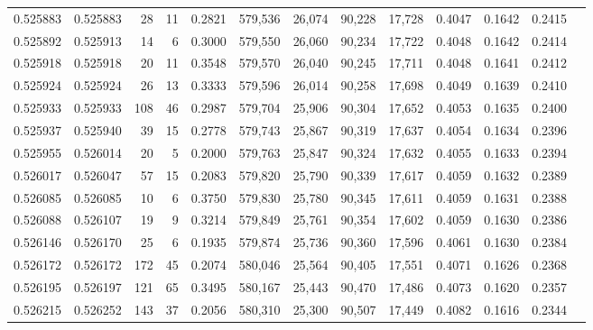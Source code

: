 \begin{tabular}{rrrrrrrrrrrrr}
0.525883 & 0.525883 &    28 &    11 &                                     0.2821 & 579,536 &  26,074 &  90,228 &  17,728 & 0.4047 & 0.1642 & 0.2415 \\
0.525892 & 0.525913 &    14 &     6 &                                     0.3000 & 579,550 &  26,060 &  90,234 &  17,722 & 0.4048 & 0.1642 & 0.2414 \\
0.525918 & 0.525918 &    20 &    11 &                                     0.3548 & 579,570 &  26,040 &  90,245 &  17,711 & 0.4048 & 0.1641 & 0.2412 \\
0.525924 & 0.525924 &    26 &    13 &                                     0.3333 & 579,596 &  26,014 &  90,258 &  17,698 & 0.4049 & 0.1639 & 0.2410 \\
0.525933 & 0.525933 &   108 &    46 &                                     0.2987 & 579,704 &  25,906 &  90,304 &  17,652 & 0.4053 & 0.1635 & 0.2400 \\
0.525937 & 0.525940 &    39 &    15 &                                     0.2778 & 579,743 &  25,867 &  90,319 &  17,637 & 0.4054 & 0.1634 & 0.2396 \\
0.525955 & 0.526014 &    20 &     5 &                                     0.2000 & 579,763 &  25,847 &  90,324 &  17,632 & 0.4055 & 0.1633 & 0.2394 \\
0.526017 & 0.526047 &    57 &    15 &                                     0.2083 & 579,820 &  25,790 &  90,339 &  17,617 & 0.4059 & 0.1632 & 0.2389 \\
0.526085 & 0.526085 &    10 &     6 &                                     0.3750 & 579,830 &  25,780 &  90,345 &  17,611 & 0.4059 & 0.1631 & 0.2388 \\
0.526088 & 0.526107 &    19 &     9 &                                     0.3214 & 579,849 &  25,761 &  90,354 &  17,602 & 0.4059 & 0.1630 & 0.2386 \\
0.526146 & 0.526170 &    25 &     6 &                                     0.1935 & 579,874 &  25,736 &  90,360 &  17,596 & 0.4061 & 0.1630 & 0.2384 \\
0.526172 & 0.526172 &   172 &    45 &                                     0.2074 & 580,046 &  25,564 &  90,405 &  17,551 & 0.4071 & 0.1626 & 0.2368 \\
0.526195 & 0.526197 &   121 &    65 &                                     0.3495 & 580,167 &  25,443 &  90,470 &  17,486 & 0.4073 & 0.1620 & 0.2357 \\
0.526215 & 0.526252 &   143 &    37 &                                     0.2056 & 580,310 &  25,300 &  90,507 &  17,449 & 0.4082 & 0.1616 & 0.2344 \\

\end{tabular}
